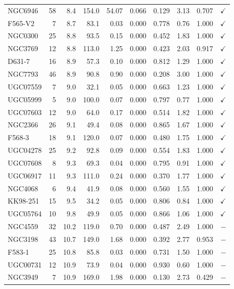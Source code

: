 \begin{longtable}{lrrrrrrrrr}
NGC6946 & 58 & 8.4 & 154.0 & 54.07 & 0.066 & 0.129 & 3.13 & 0.707 & $\checkmark$ \\
F565-V2 & 7 & 8.7 & 83.1 & 0.03 & 0.000 & 0.778 & 0.76 & 1.000 & $\checkmark$ \\
NGC0300 & 25 & 8.8 & 93.5 & 0.15 & 0.000 & 0.452 & 1.83 & 1.000 & $\checkmark$ \\
NGC3769 & 12 & 8.8 & 113.0 & 1.25 & 0.000 & 0.423 & 2.03 & 0.917 & $\checkmark$ \\
D631-7 & 16 & 8.9 & 57.3 & 0.10 & 0.000 & 0.812 & 1.29 & 1.000 & $\checkmark$ \\
NGC7793 & 46 & 8.9 & 90.8 & 0.90 & 0.000 & 0.208 & 3.00 & 1.000 & $\checkmark$ \\
UGC07559 & 7 & 9.0 & 32.1 & 0.05 & 0.000 & 0.663 & 1.23 & 1.000 & $\checkmark$ \\
UGC05999 & 5 & 9.0 & 100.0 & 0.07 & 0.000 & 0.797 & 0.77 & 1.000 & $\checkmark$ \\
UGC07603 & 12 & 9.0 & 64.0 & 0.17 & 0.000 & 0.514 & 1.82 & 1.000 & $\checkmark$ \\
NGC2366 & 26 & 9.1 & 49.4 & 0.08 & 0.000 & 0.865 & 1.67 & 1.000 & $\checkmark$ \\
F568-3 & 18 & 9.1 & 120.0 & 0.07 & 0.000 & 0.480 & 1.75 & 1.000 & $\checkmark$ \\
UGC04278 & 25 & 9.2 & 92.8 & 0.09 & 0.000 & 0.554 & 1.83 & 1.000 & $\checkmark$ \\
UGC07608 & 8 & 9.3 & 69.3 & 0.04 & 0.000 & 0.795 & 0.91 & 1.000 & $\checkmark$ \\
UGC06917 & 11 & 9.3 & 111.0 & 0.24 & 0.000 & 0.370 & 1.77 & 1.000 & $\checkmark$ \\
NGC4068 & 6 & 9.4 & 41.9 & 0.08 & 0.000 & 0.560 & 1.55 & 1.000 & $\checkmark$ \\
KK98-251 & 15 & 9.5 & 34.2 & 0.05 & 0.000 & 0.806 & 0.84 & 1.000 & $\checkmark$ \\
UGC05764 & 10 & 9.8 & 49.9 & 0.05 & 0.000 & 0.866 & 1.06 & 1.000 & $\checkmark$ \\
\midrule
NGC4559 & 32 & 10.2 & 119.0 & 0.70 & 0.000 & 0.487 & 2.49 & 1.000 & $-$ \\
NGC3198 & 43 & 10.7 & 149.0 & 1.68 & 0.000 & 0.392 & 2.77 & 0.953 & $-$ \\
F583-1 & 25 & 10.8 & 85.8 & 0.03 & 0.000 & 0.731 & 1.50 & 1.000 & $-$ \\
UGC00731 & 12 & 10.9 & 73.9 & 0.04 & 0.000 & 0.930 & 0.60 & 1.000 & $-$ \\
NGC3949 & 7 & 10.9 & 169.0 & 1.98 & 0.000 & 0.130 & 2.73 & 0.429 & $-$ \\

\end{longtable}

